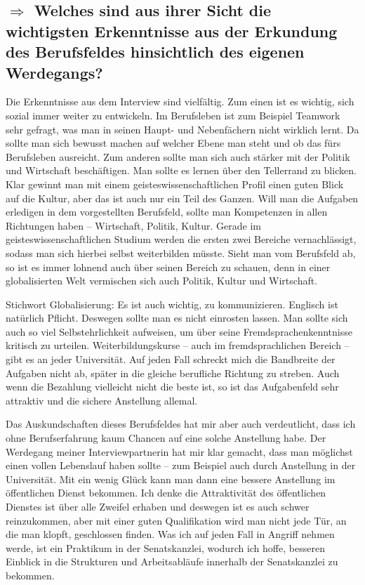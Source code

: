 \documentclass[12pt,headsepline,a4paper]{scrartcl}
\newcommand\quest[1]{\subsection*{$\Rightarrow$ #1}}
\begin{document}
\quest{Welches sind aus ihrer Sicht die wichtigsten Erkenntnisse aus der Erkundung des Berufsfeldes hinsichtlich des eigenen Werdegangs?}
Die Erkenntnisse aus dem Interview sind vielfältig. Zum einen ist es wichtig, sich sozial immer weiter zu entwickeln. Im Berufsleben ist zum Beispiel Teamwork sehr gefragt, was man in seinen Haupt- und Nebenfächern nicht wirklich lernt. Da sollte man sich bewusst machen auf welcher Ebene man steht und ob das fürs Berufsleben ausreicht.
Zum anderen sollte man sich auch stärker mit der Politik und Wirtschaft beschäftigen. Man sollte es lernen über den Tellerrand zu blicken. Klar gewinnt man mit einem geisteswissenschaftlichen Profil einen guten Blick auf die Kultur, aber das ist auch nur ein Teil des Ganzen. Will man die Aufgaben erledigen in dem  vorgestellten Berufsfeld, sollte man Kompetenzen in allen Richtungen haben -- Wirtschaft, Politik, Kultur. Gerade im geisteswissenschaftlichen Studium werden die ersten zwei Bereiche vernachlässigt, sodass man sich hierbei selbst weiterbilden müsste. Sieht man vom Berufsfeld ab, so ist es immer lohnend auch über seinen Bereich zu schauen, denn in einer globalisierten Welt vermischen sich auch Politik, Kultur und Wirtschaft. 

Stichwort Globalisierung: Es ist auch wichtig, zu kommunizieren. Englisch ist natürlich Pflicht. Deswegen sollte man es nicht einrosten lassen. Man sollte sich auch so viel Selbstehrlichkeit aufweisen, um über seine Fremdsprachenkenntnisse kritisch zu urteilen. Weiterbildungskurse -- auch im fremdsprachlichen Bereich -- gibt es an jeder Universität.
Auf jeden Fall schreckt mich die Bandbreite der Aufgaben nicht ab, später in die gleiche berufliche Richtung zu streben. Auch wenn die Bezahlung vielleicht nicht die beste ist, so ist das Aufgabenfeld sehr attraktiv und die sichere Anstellung allemal. 

Das Auskundschaften dieses Berufsfeldes hat mir aber auch verdeutlicht, dass ich ohne Berufserfahrung kaum Chancen auf eine solche Anstellung habe. Der Werdegang meiner Interviewpartnerin hat mir klar gemacht, dass man möglichst einen vollen Lebenslauf haben sollte -- zum Beispiel auch durch Anstellung in der Universität. Mit ein wenig Glück kann man dann eine bessere Anstellung im öffentlichen Dienst bekommen.
Ich denke die Attraktivität des öffentlichen Dienstes ist über alle Zweifel erhaben und deswegen ist es auch schwer reinzukommen, aber mit einer guten Qualifikation wird man nicht jede Tür, an die man klopft, geschlossen finden. 
Was ich auf jeden Fall in Angriff nehmen werde, ist ein Praktikum in der Senatskanzlei, wodurch ich hoffe, besseren Einblick in die Strukturen und Arbeitsabläufe innerhalb der Senatskanzlei zu bekommen.
\end{document}
